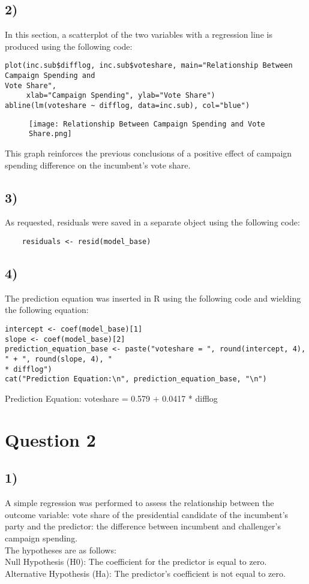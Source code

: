 \documentclass[oneside]{article}
\begin{document}
\subsection*{2)}
In this section, a scatterplot of the two variables with a regression line is produced using the following code:
\begin{verbatim}
plot(inc.sub$difflog, inc.sub$voteshare, main="Relationship Between Campaign Spending and
Vote Share", 
     xlab="Campaign Spending", ylab="Vote Share")
abline(lm(voteshare ~ difflog, data=inc.sub), col="blue")

\end{verbatim}
\begin{figure} [h]
    \centering
    \texttt{[image: Relationship Between Campaign Spending and Vote Share.png]}
        
\end{figure}

This graph reinforces the previous conclusions of a positive effect of campaign spending difference on the incumbent's vote share.

\subsection*{3)}
As requested, residuals were saved in a separate object using the following code:
\begin{verbatim}
    residuals <- resid(model_base)
\end{verbatim}

\subsection*{4)}
The prediction equation was inserted in R using the following code and wielding the following equation:
\begin{verbatim}
intercept <- coef(model_base)[1]  
slope <- coef(model_base)[2]      
prediction_equation_base <- paste("voteshare = ", round(intercept, 4), " + ", round(slope, 4), "
* difflog")
cat("Prediction Equation:\n", prediction_equation_base, "\n")
\end{verbatim}

Prediction Equation:
 voteshare =  0.579  +  0.0417  * difflog 

\section*{Question 2}
\subsection*{1)}
A simple regression was performed to assess the relationship between the outcome variable: vote share of the presidential candidate of the incumbent's party and the predictor: the difference between incumbent and challenger's campaign spending. 
\\
The hypotheses are as follows:\\
Null Hypothesis (H0): The coefficient for the predictor is equal to zero.\\
Alternative Hypothesis (Ha): The predictor's coefficient is not equal to zero.
\end{document}
